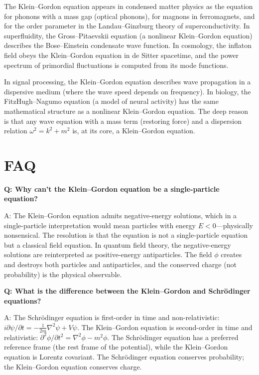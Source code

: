 The Klein--Gordon equation appears in condensed matter physics as the equation for phonons with a mass gap (optical phonons), for magnons in ferromagnets, and for the order parameter in the Landau--Ginzburg theory of superconductivity. In superfluidity, the Gross--Pitaevskii equation (a nonlinear Klein--Gordon equation) describes the Bose--Einstein condensate wave function. In cosmology, the inflaton field obeys the Klein--Gordon equation in de Sitter spacetime, and the power spectrum of primordial fluctuations is computed from its mode functions.

In signal processing, the Klein--Gordon equation describes wave propagation in a dispersive medium (where the wave speed depends on frequency). In biology, the FitzHugh--Nagumo equation (a model of neural activity) has the same mathematical structure as a nonlinear Klein--Gordon equation. The deep reason is that any wave equation with a mass term (restoring force) and a dispersion relation $\omega^2 = k^2 + m^2$ is, at its core, a Klein--Gordon equation.



\section*{FAQ}

\textbf{Q: Why can't the Klein--Gordon equation be a single-particle equation?}

A: The Klein--Gordon equation admits negative-energy solutions, which in a single-particle interpretation would mean particles with energy $E < 0$---physically nonsensical. The resolution is that the equation is not a single-particle equation but a classical field equation. In quantum field theory, the negative-energy solutions are reinterpreted as positive-energy antiparticles. The field $\phi$ creates and destroys both particles and antiparticles, and the conserved charge (not probability) is the physical observable.

\textbf{Q: What is the difference between the Klein--Gordon and Schr\"odinger equations?}

A: The Schr\"odinger equation is first-order in time and non-relativistic: $i\partial\psi/\partial t = -\frac{1}{2m}\nabla^2\psi + V\psi$. The Klein--Gordon equation is second-order in time and relativistic: $\partial^2\phi/\partial t^2 = \nabla^2\phi - m^2\phi$. The Schr\"odinger equation has a preferred reference frame (the rest frame of the potential), while the Klein--Gordon equation is Lorentz covariant. The Schr\"odinger equation conserves probability; the Klein--Gordon equation conserves charge.

